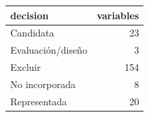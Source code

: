 \begin{tabular}{lr}
\toprule
decision & variables \\
\midrule
Candidata & 23 \\
Evaluación/diseño & 3 \\
Excluir & 154 \\
No incorporada & 8 \\
Representada & 20 \\
\bottomrule
\end{tabular}
